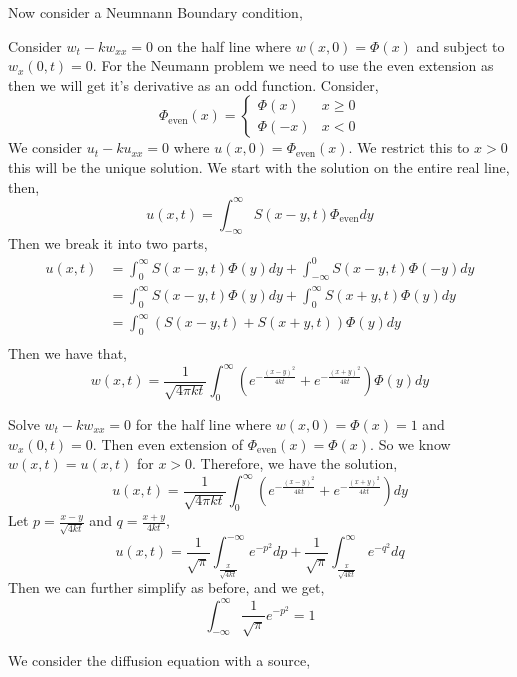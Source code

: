 \noindent
Now consider a Neumnann Boundary condition,
\begin{eg}
  Consider $w_t - kw_{xx} = 0$ on the half line where $w(x, 0) = \Phi(x)$ and subject to $w_x(0, t) = 0$. For the Neumann problem we need to use the even extension as then we will get it's derivative as an odd function. Consider,
  $$ \Phi_\text{even}(x) = \begin{cases}
    \Phi(x) & x \ge 0 \\
    \Phi(-x) & x < 0
  \end{cases} $$
  We consider $u_t - ku_{xx} = 0$ where $u(x, 0) = \Phi_\text{even}(x)$. We restrict this to $x > 0$ this will be the unique solution. We start with the solution on the entire real line, then,
  $$ u(x, t) = \int_{-\infty}^\infty S(x - y, t)\Phi_\text{even}dy $$
  Then we break it into two parts,
  \begin{align*}
    u(x, t) &= \int_{0}^\infty S(x - y, t)\Phi(y)dy + \int_{-\infty}^0 S(x - y, t)\Phi(-y)dy\\
    &= \int_{0}^\infty S(x - y, t)\Phi(y)dy + \int^{\infty}_0 S(x + y, t)\Phi(y)dy\\
    &= \int_{0}^\infty \left(S(x - y, t) + S(x + y, t)\right)\Phi(y)dy\\
  \end{align*}
  Then we have that,
  $$ w(x, t) = \frac{1}{\sqrt{4\pi kt}}\int_0^\infty \left(e^{-\frac{(x - y)^2}{4kt}} + e^{-\frac{(x + y)^2}{4kt}}\right)\Phi(y) dy $$
\end{eg}

\begin{eg}
  Solve $w_t - kw_{xx} = 0$ for the half line where $w(x, 0) = \Phi(x) = 1$ and $w_x(0, t) = 0$. Then even extension of $\Phi_{\text{even}}(x) = \Phi(x)$. So we know $w(x, t) = u(x, t)$ for $x > 0$. Therefore, we have the solution,
  $$ u(x, t) = \frac{1}{\sqrt{4\pi kt}}\int_0^\infty \left(e^{-\frac{(x - y)^2}{4kt}} + e^{-\frac{(x + y)^2}{4kt}}\right)dy $$
  Let $p = \frac{x - y}{\sqrt{4kt}}$ and $q = \frac{x + y}{4kt}$,
  $$ u(x, t) = \frac{1}{\sqrt \pi}\int_{\frac{x}{\sqrt{4kt}}}^{-\infty} e^{-p^2}dp + \frac{1}{\sqrt \pi} \int_{\frac{x}{\sqrt{4kt}}}^{\infty} e^{-q^2}dq $$
  Then we can further simplify as before, and we get,
  $$ \int_{-\infty}^\infty \frac{1}{\sqrt{\pi}}e^{-p^2} = 1 $$
\end{eg}

\noindent
We consider the diffusion equation with a source,

